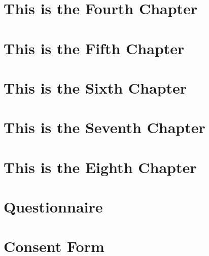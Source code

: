 \documentclass[12pt]{caltech_thesis}
\begin{document}
\chapter{This is the Fourth Chapter}
\chapter{This is the Fifth Chapter}
\chapter{This is the Sixth Chapter}
\chapter{This is the Seventh Chapter}
\chapter{This is the Eighth Chapter}

\printbibliography[heading=bibintoc]

\appendix

\chapter{Questionnaire}
\chapter{Consent Form}

\printindex

\theendnotes

\pocketmaterial
{} 
\end{document}
